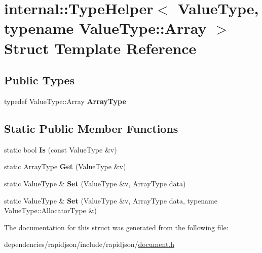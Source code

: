 \hypertarget{structinternal_1_1_type_helper_3_01_value_type_00_01typename_01_value_type_1_1_array_01_4}{}\section{internal\+:\+:Type\+Helper$<$ Value\+Type, typename Value\+Type\+:\+:Array $>$ Struct Template Reference}
\label{structinternal_1_1_type_helper_3_01_value_type_00_01typename_01_value_type_1_1_array_01_4}
\subsection*{Public Types}
\begin{DoxyCompactItemize}
\item 
\mbox{\label{structinternal_1_1_type_helper_3_01_value_type_00_01typename_01_value_type_1_1_array_01_4_a8f384dc96b6104e85b956ec5f7386434}} 
typedef Value\+Type\+::\+Array {\bfseries Array\+Type}
\end{DoxyCompactItemize}
\subsection*{Static Public Member Functions}
\begin{DoxyCompactItemize}
\item 
\mbox{\label{structinternal_1_1_type_helper_3_01_value_type_00_01typename_01_value_type_1_1_array_01_4_a2a052fc0139112075f8bade42964273d}} 
static bool {\bfseries Is} (const Value\+Type \&v)
\item 
\mbox{\label{structinternal_1_1_type_helper_3_01_value_type_00_01typename_01_value_type_1_1_array_01_4_a0e6bd47ab5da0387bf419cdf644035ab}} 
static Array\+Type {\bfseries Get} (Value\+Type \&v)
\item 
\mbox{\label{structinternal_1_1_type_helper_3_01_value_type_00_01typename_01_value_type_1_1_array_01_4_a7bab3fa93fb8bda16baf289e1d281315}} 
static Value\+Type \& {\bfseries Set} (Value\+Type \&v, Array\+Type data)
\item 
\mbox{\label{structinternal_1_1_type_helper_3_01_value_type_00_01typename_01_value_type_1_1_array_01_4_adba46e8947dcfecaeca5a5a5d8bb36cc}} 
static Value\+Type \& {\bfseries Set} (Value\+Type \&v, Array\+Type data, typename Value\+Type\+::\+Allocator\+Type \&)
\end{DoxyCompactItemize}


The documentation for this struct was generated from the following file\+:\begin{DoxyCompactItemize}
\item 
dependencies/rapidjson/include/rapidjson/\hyperlink{document_8h}{document.\+h}\end{DoxyCompactItemize}
